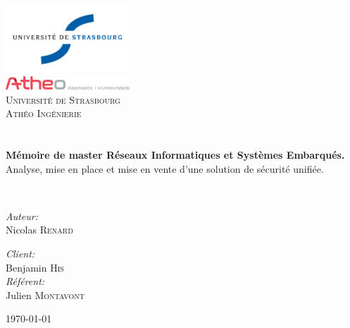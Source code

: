\begin{titlepage}
\begin{center}

\includegraphics[width=0.35\textwidth]{../img/logo-uds}~\\[0.5cm]
\includegraphics[width=0.35\textwidth]{../img/logo_menu.png}~\\[1cm]

\textsc{\LARGE Université de Strasbourg} \\[0.5cm]
\textsc{\LARGE Athéo Ingénierie}\\[1.5cm]


\textsc{\Large }\\[0.5cm]

\HRule \\[0.4cm]

{\huge {\bfseries Mémoire de master Réseaux Informatiques et Systèmes Embarqués.}\\
Analyse, mise en place et mise en vente d'une solution de sécurité unifiée. \\[0.4cm] }

\HRule \\[1.5cm]

\begin{minipage}{0.4\textwidth}
\begin{flushleft} \large
\emph{Auteur:}\\
Nicolas \textsc{Renard}\\
\end{flushleft}
\end{minipage}
\begin{minipage}{0.4\textwidth}
\begin{flushright} \large
\emph{Client:} \\
Benjamin \textsc{His}\\
\emph{Référent:} \\
Julien \textsc{Montavont}
\end{flushright}
\end{minipage}

\vfill

{\large \today}

\end{center}
\end{titlepage}
